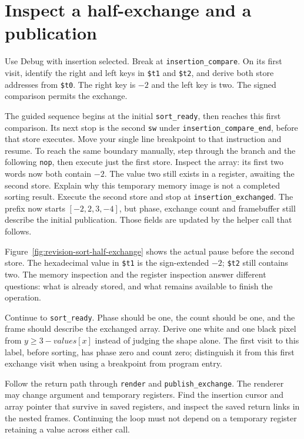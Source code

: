 \section{Inspect a half-exchange and a publication}

Use Debug with insertion selected. Break at \texttt{insertion\_compare}. On its
first visit, identify the right and left keys in \texttt{\$t1} and
\texttt{\$t2}, and derive both store addresses from \texttt{\$t0}. The right key
is $-2$ and the left key is two. The signed comparison permits the exchange.

The guided sequence begins at the initial \texttt{sort\_ready}, then reaches
this first comparison. Its next stop is the second \texttt{sw} under
\texttt{insertion\_compare\_end}, before that store executes. Move your single
line breakpoint to that instruction and resume. To reach the same boundary
manually, step through the branch and the following \texttt{nop}, then execute
just the first store. Inspect the array: its first two words now both contain $-2$.
The value two still exists in a register, awaiting the second store. Explain
why this temporary memory image is not a completed sorting result. Execute the
second store and stop at \texttt{insertion\_exchanged}. The prefix now starts
$[-2,2,3,-4]$, but phase, exchange count and framebuffer still describe the initial
publication. Those fields are updated by the helper call that follows.

Figure~\ref{fig:revision-sort-half-exchange} shows the actual pause before the
second store. The hexadecimal value in \texttt{\$t1} is the sign-extended $-2$;
\texttt{\$t2} still contains two. The memory inspection and the register
inspection answer different questions: what is already stored, and what remains
available to finish the operation.



Continue to \texttt{sort\_ready}. Phase should be one, the count should be one,
and the frame should describe the exchanged array. Derive one white and one
black pixel from $y\geq3-values[x]$ instead of judging the shape alone. The first
visit to this label, before sorting, has phase zero and count zero; distinguish
it from this first exchange visit when using a breakpoint from program entry.

Follow the return path through \texttt{render} and \texttt{publish\_exchange}.
The renderer may change argument and temporary registers. Find the insertion
cursor and array pointer that survive in saved registers, and inspect the saved
return links in the nested frames. Continuing the loop must not depend on a
temporary register retaining a value across either call.

